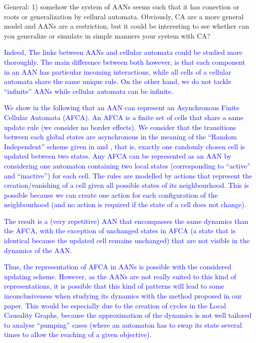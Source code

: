 \documentclass[11pt]{article}
\newcommand{\ilanswer}[1]{\textcolor{blue}{#1}}
\begin{document}
General: 1) somehow the system of AANs seems such that it has conection or roots or generalization by cellural automata. Obviously, CA are a more general model and AANs are a restriction, but it could be interesting to see whether can you generalize or simulate in simple manners your system with CA?

\ilanswer{Indeed, The links between AANs and cellular automata could be studied more thoroughly.
The main difference between both however, is that each component in an AAN has particular incoming interactions, while all cells of a cellular automata share the same unique rule.
On the other hand, we do not tackle “infinite” AANs while cellular automata can be infinite.}

\ilanswer{We show in the following that an AAN can represent an Asynchronous Finite Cellular Automata (AFCA).
An AFCA is a finite set of cells that share a same update rule (we consider no border effects).
We consider that the transitions between each global states are asynchronous in the meaning of the “Random Independent” scheme given in \cite{cornforth_artificial_2003} and \cite{harvey_time_1997},
that is, exactly one randomly chosen cell is updated between two states.
Any AFCA can be represented as an AAN by considering one automaton containing two local states (corresponding to “active” and “inactive”) for each cell.
The rules are modelled by actions that represent the creation/vanishing of a cell given all possible states of its neighbourhood.
This is possible because we can create one action for each configuration of the neighbourhood (and no action is required if the state of a cell does not change).}

\ilanswer{The result is a (very repetitive) AAN that encompasses the same dynamics than the AFCA,
with the exception of unchanged states in AFCA (a state that is identical because the updated cell remains unchanged) that are not visible in the dynamics of the AAN.}

\ilanswer{Thus, the representation of AFCA in AANs is possible with the considered updating scheme.
However, as the AANs are not really suited to this kind of representations,
it is possible that this kind of patterns will lead to some inconclusiveness
when studying its dynamics with the method proposed in our paper.
This would be especially due to the creation of cycles in the Local Causality Graphs,
because the approximation of the dynamics is not well tailored to analyse “pumping” cases
(where an automaton has to swap its state several times to allow the reaching of a given objective).}
\end{document}
